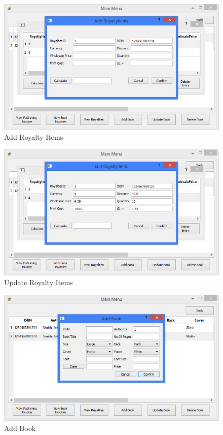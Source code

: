 \begin{figure}[H]
    \caption{Add Royalty Items} \label{fig:AddRoyaltyItems}
    \includegraphics[width=\textwidth]{./Maintenance/UserInterface/AddRoyaltyItems.png}
\end{figure}

\begin{figure}[H]
    \caption{Update Royalty Items} \label{fig:UpdateRoyaltyItems}
    \includegraphics[width=\textwidth]{./Maintenance/UserInterface/UpdateRoyaltyItems.png}
\end{figure}

\begin{figure}[H]
    \caption{Add Book} \label{fig:AddBook}
    \includegraphics[width=\textwidth]{./Maintenance/UserInterface/AddBook.png}
\end{figure}

